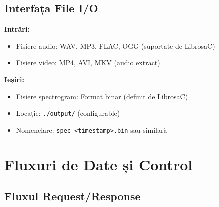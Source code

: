 \documentclass[12pt,a4paper,twoside]{article}
\begin{document}
\subsection{Interfața File I/O}

\textbf{Intrări:}
\begin{itemize}
    \item Fișiere audio: WAV, MP3, FLAC, OGG (suportate de LibrosaC)
    \item Fișiere video: MP4, AVI, MKV (audio extract)
\end{itemize}

\textbf{Ieșiri:}
\begin{itemize}
    \item Fișiere spectrogram: Format binar (definit de LibrosaC)
    \item Locație: \texttt{./output/} (configurable)
    \item Nomenclare: \texttt{spec\_<timestamp>.bin} sau similară
\end{itemize}

\section{Fluxuri de Date și Control}

\subsection{Fluxul Request/Response}
\end{document}
